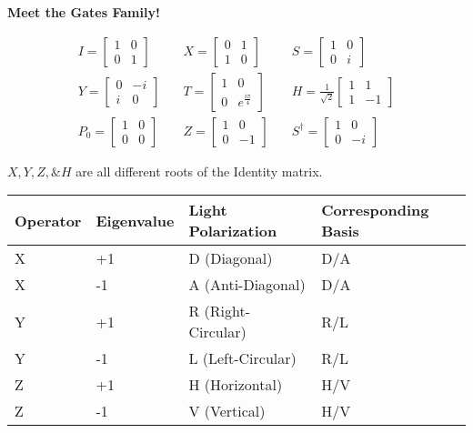\documentclass[
]{article}
\author{}
\date{}
\begin{document}
{
\setcounter{tocdepth}{3}
\tableofcontents
}
\textbf{Meet the Gates Family!}

\[
\begin{align*}
I=\begin{bmatrix}
1 & 0  \\ 0 & 1
\end{bmatrix}
 &\quad
  X = \begin{bmatrix}
0 & 1 \\ 1  &  0
\end{bmatrix} 
 &\quad 
S=\begin{bmatrix}
1 & 0  \\ 0 & i
\end{bmatrix} \quad
\\
Y=\begin{bmatrix}
0 & -i \\ i & 0
\end{bmatrix} 
 &\quad
T=\begin{bmatrix}
1 & 0 \\ 0 & e^{\frac{i\pi}{4}}
\end{bmatrix} 
 &\quad 
H =\frac{1}{\sqrt{2}}\begin{bmatrix}
1 & 1  \\ 1 & -1
\end{bmatrix} 
\\
P_0=\begin{bmatrix}
1 & 0 \\ 0  & 0
\end{bmatrix} 
 &\quad
Z=\begin{bmatrix}
1 & 0 \\ 0 & -1
\end{bmatrix} &\quad
S^{\dagger}=\begin{bmatrix}
1 & 0 \\ 0 & -i
\end{bmatrix}
\end{align*}\]

\(X,Y,Z,\& H\) are all different roots of the Identity matrix.

\begin{longtable}[]{@{}llll@{}}
\toprule\noalign{}
Operator & Eigenvalue & Light Polarization & Corresponding Basis \\
\midrule\noalign{}
\endhead
\bottomrule\noalign{}
\endlastfoot
X & +1 & D (Diagonal) & D/A \\
X & -1 & A (Anti-Diagonal) & D/A \\
Y & +1 & R (Right-Circular) & R/L \\
Y & -1 & L (Left-Circular) & R/L \\
Z & +1 & H (Horizontal) & H/V \\
Z & -1 & V (Vertical) & H/V \\
\end{longtable}
\end{document}
